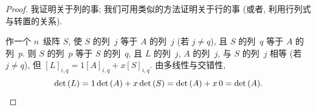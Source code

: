 \documentclass[../libro.tex]{subfiles}
\begin{document}
\begin{proof}
    我证明关于列的事;
    我们可用类似的方法证明关于行的事
    (或者, 利用行列式与转置的关系).

    作一个 \(n\)~级阵 \(S\),
    使 \(S\) 的列~\(j\) 等于 \(A\) 的列~\(j\)
    (若 \(j \neq q\)),
    且 \(S\) 的列~\(q\) 等于 \(A\) 的列~\(p\).
    则 \(S\) 的列~\(p\) 等于 \(S\) 的列~\(q\),
    且 \(L\) 的列~\(j\), \(A\) 的列~\(j\),
    与 \(S\) 的列~\(j\) 相等
    (若 \(j \neq q\)),
    但 \([L]_{i,q} = 1 [A]_{i,q} + x [S]_{i,q}\).
    由多线性与交错性,
    \begin{equation*}
        \det {(L)}
        =
        1 \det {(A)} + x \det {(S)}
        =
        \det {(A)} + x\, 0
        =
        \det {(A)}.
        \qedhere
    \end{equation*}


\end{proof}
\end{document}

